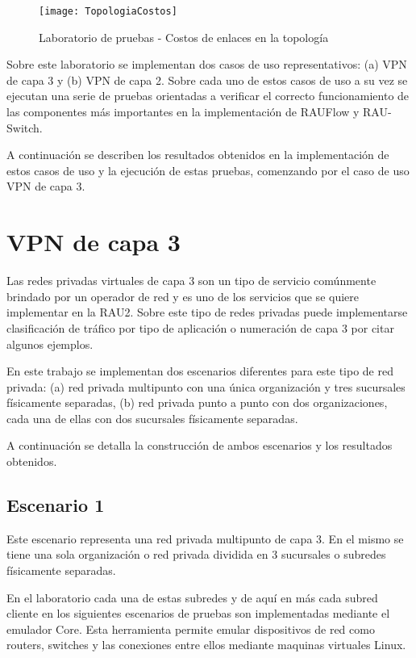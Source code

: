 \begin{figure}[ht!] 
\centering    
\texttt{[image: TopologiaCostos]}
\caption[Laboratorio de pruebas - Costos de enlaces en la topolog\'ia]{Laboratorio de pruebas - Costos de enlaces en la topolog\'ia}
\label{fig:LaboratorioDePruebasCostos}
\end{figure}

Sobre este laboratorio se implementan dos casos de uso representativos: (a) VPN de capa 3 y (b) VPN de capa 2. Sobre cada uno de estos casos de uso a su vez se ejecutan una serie de pruebas orientadas a verificar el correcto funcionamiento de las componentes m\'as importantes en la implementaci\'on de RAUFlow y RAU-Switch.

A continuaci\'on se describen los resultados obtenidos en la implementaci\'on de estos casos de uso y la ejecuci\'on de estas pruebas, comenzando por el caso de uso VPN de capa 3.

\section{VPN de capa 3}

Las redes privadas virtuales de capa 3 son un tipo de servicio comúnmente brindado por un operador de red y es uno de los servicios que se quiere implementar en la RAU2. Sobre este tipo de redes privadas puede implementarse clasificaci\'on de tr\'afico por tipo de aplicaci\'on o numeraci\'on de capa 3 por citar algunos ejemplos.

En este trabajo se implementan dos escenarios diferentes para este tipo de red privada: (a) red privada multipunto con una \'unica organizaci\'on y tres sucursales f\'isicamente separadas, (b) red privada punto a punto con dos organizaciones, cada una de ellas con dos sucursales f\'isicamente separadas. 

A continuaci\'on se detalla la construcci\'on de ambos escenarios y los resultados obtenidos.

\subsection{Escenario 1}

Este escenario representa una red privada multipunto de capa 3. En el mismo se tiene una sola organizaci\'on o red privada dividida en 3 sucursales o subredes físicamente separadas.

En el laboratorio cada una de estas subredes y de aqu\'i en m\'as cada subred cliente en los siguientes escenarios de pruebas son implementadas mediante el emulador Core\cite{Core}. Esta herramienta permite emular dispositivos de red como routers, switches y las conexiones entre ellos mediante maquinas virtuales Linux. 

